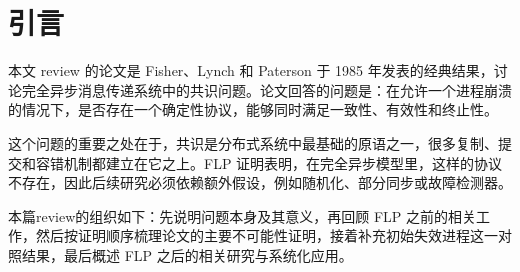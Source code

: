 \section{引言}

本文 review 的论文是 Fisher、Lynch 和 Paterson 于 1985 年发表的经典结果，讨论完全异步消息传递系统中的共识问题。论文回答的问题是：在允许一个进程崩溃的情况下，是否存在一个确定性协议，能够同时满足一致性、有效性和终止性。

这个问题的重要之处在于，共识是分布式系统中最基础的原语之一，很多复制、提交和容错机制都建立在它之上。FLP 证明表明，在完全异步模型里，这样的协议不存在，因此后续研究必须依赖额外假设，例如随机化、部分同步或故障检测器。

本篇review的组织如下：先说明问题本身及其意义，再回顾 FLP 之前的相关工作，然后按证明顺序梳理论文的主要不可能性证明，接着补充初始失效进程这一对照结果，最后概述 FLP 之后的相关研究与系统化应用。
